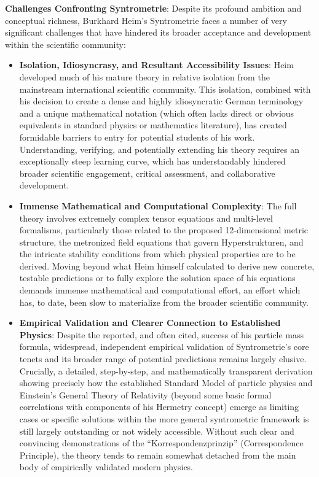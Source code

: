 \documentclass[12pt]{article}
\begin{document}
\textbf{Challenges Confronting Syntrometrie}:
Despite its profound ambition and conceptual richness, Burkhard Heim's Syntrometrie faces a number of very significant challenges that have hindered its broader acceptance and development within the scientific community:
\begin{itemize}
    \item \textbf{Isolation, Idiosyncrasy, and Resultant Accessibility Issues}: Heim developed much of his mature theory in relative isolation from the mainstream international scientific community. This isolation, combined with his decision to create a dense and highly idiosyncratic German terminology and a unique mathematical notation (which often lacks direct or obvious equivalents in standard physics or mathematics literature), has created formidable barriers to entry for potential students of his work. Understanding, verifying, and potentially extending his theory requires an exceptionally steep learning curve, which has understandably hindered broader scientific engagement, critical assessment, and collaborative development.
    \item \textbf{Immense Mathematical and Computational Complexity}: The full theory involves extremely complex tensor equations and multi-level formalisms, particularly those related to the proposed 12-dimensional metric structure, the metronized field equations that govern Hyperstrukturen, and the intricate stability conditions from which physical properties are to be derived. Moving beyond what Heim himself calculated to derive new concrete, testable predictions or to fully explore the solution space of his equations demands immense mathematical and computational effort, an effort which has, to date, been slow to materialize from the broader scientific community.
    \item \textbf{Empirical Validation and Clearer Connection to Established Physics}: Despite the reported, and often cited, success of his particle mass formula, widespread, independent empirical validation of Syntrometrie's core tenets and its broader range of potential predictions remains largely elusive. Crucially, a detailed, step-by-step, and mathematically transparent derivation showing precisely how the established Standard Model of particle physics and Einstein's General Theory of Relativity (beyond some basic formal correlations with components of his Hermetry concept) emerge as limiting cases or specific solutions within the more general syntrometric framework is still largely outstanding or not widely accessible. Without such clear and convincing demonstrations of the \enquote{Korrespondenzprinzip} (Correspondence Principle), the theory tends to remain somewhat detached from the main body of empirically validated modern physics.

\end{itemize}
\end{document}

